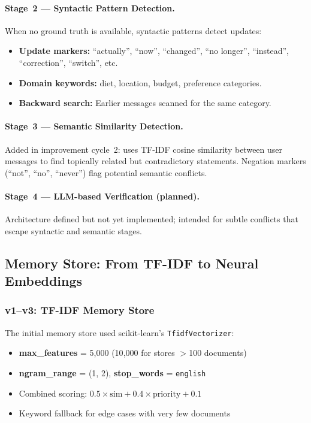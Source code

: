 \documentclass[11pt,a4paper]{article}
\begin{document}
\paragraph{Stage~2 --- Syntactic Pattern Detection.}
When no ground truth is available, syntactic patterns detect updates:
\begin{itemize}[nosep]
    \item \textbf{Update markers:} ``actually'', ``now'', ``changed'', ``no longer'',
          ``instead'', ``correction'', ``switch'', etc.
    \item \textbf{Domain keywords:} diet, location, budget, preference categories.
    \item \textbf{Backward search:} Earlier messages scanned for the same category.
\end{itemize}

\paragraph{Stage~3 --- Semantic Similarity Detection.}
Added in improvement cycle~2: uses TF-IDF cosine similarity between user
messages to find topically related but contradictory statements.  Negation
markers (``not'', ``no'', ``never'') flag potential semantic conflicts.

\paragraph{Stage~4 --- LLM-based Verification (planned).}
Architecture defined but not yet implemented; intended for subtle conflicts
that escape syntactic and semantic stages.


\subsection{Memory Store: From TF-IDF to Neural Embeddings}
\label{sec:memstore}

\subsubsection{v1--v3: TF-IDF Memory Store}

The initial memory store used scikit-learn's \texttt{TfidfVectorizer}:
\begin{itemize}[nosep]
    \item \textbf{max\_features} = 5{,}000 (10{,}000 for stores $>$100 documents)
    \item \textbf{ngram\_range} = (1, 2), \textbf{stop\_words} = \texttt{english}
    \item Combined scoring: $0.5 \times \text{sim} + 0.4 \times \text{priority} + 0.1$
    \item Keyword fallback for edge cases with very few documents
\end{itemize}
\end{document}
